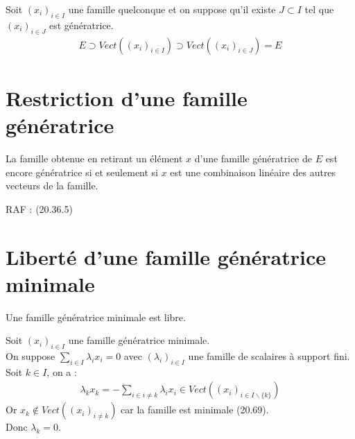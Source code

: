 \documentclass[../main.tex]{subfiles}
\begin{document}
\noindent Soit $(x_i)_{i\in I}$ une famille quelconque et on suppose qu'il existe $J \subset I$ tel que $(x_i)_{i\in J}$ est génératrice. \\
\begin{align*}
    E \supset Vect((x_i)_{i\in I}) \supset Vect((x_i)_{i\in J}) = E
\end{align*}

\section{Restriction d'une famille génératrice}
\begin{tcolorbox}[title=Propostion 20.69, title filled=false, colframe=lightblue, colback=lightblue!10!white]
    La famille obtenue en retirant un élément $x$ d'une famille génératrice de $E$ est encore génératrice si et seulement si $x$ est une combinaison linéaire des autres vecteurs de la famille. 
\end{tcolorbox}

\noindent RAF : (20.36.5)

\section{Liberté d'une famille génératrice minimale}
\begin{tcolorbox}[title=Propostion 20.71, title filled=false, colframe=lightblue, colback=lightblue!10!white]
    Une famille génératrice minimale est libre. 
\end{tcolorbox}

\noindent Soit $(x_i)_{i\in I}$ une famille génératrice minimale. \\
On suppose $\sum\limits_{i\in I} \lambda_i x_i = 0$ avec $(\lambda_i)_{i\in I}$ une famille de scalaires à support fini. \\
Soit $k\in I$, on a : 
\begin{align*}
    \lambda_k x_k = -\sum_{i\in i \neq k} \lambda_i x_i \in Vect((x_i)_{i\in I \backslash \{k\}})
\end{align*}
Or $x_k \not \in Vect((x_i)_{i \neq k})$ car la famille est minimale (20.69). \\
Donc $\lambda_k = 0$. 
\end{document}
